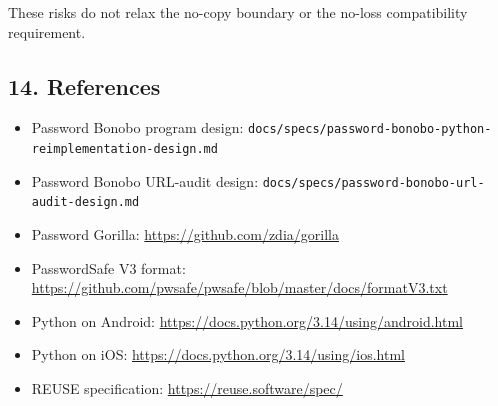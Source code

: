 \documentclass[
  letterpaper,
]{article}
\providecommand{\tightlist}{%
  \setlength{\itemsep}{0pt}\setlength{\parskip}{0pt}}
\begin{document}
These risks do not relax the no-copy boundary or the no-loss compatibility requirement.

\subsection{14. References}\label{14-references}

\begin{itemize}
\tightlist
\item
  Password Bonobo program design: \nolinkurl{docs/specs/password-bonobo-python-reimplementation-design.md}
\item
  Password Bonobo URL-audit design: \nolinkurl{docs/specs/password-bonobo-url-audit-design.md}
\item
  Password Gorilla: \url{https://github.com/zdia/gorilla}
\item
  PasswordSafe V3 format: \url{https://github.com/pwsafe/pwsafe/blob/master/docs/formatV3.txt}
\item
  Python on Android: \url{https://docs.python.org/3.14/using/android.html}
\item
  Python on iOS: \url{https://docs.python.org/3.14/using/ios.html}
\item
  REUSE specification: \url{https://reuse.software/spec/}
\end{itemize}
\end{document}
